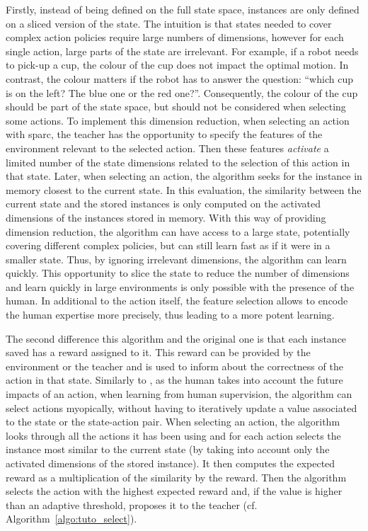 Firstly, instead of being defined on the full state space, instances are only defined on a sliced version of the state. The intuition is that states needed to cover complex action policies require large numbers of dimensions, however for each single action, large parts of the state are irrelevant. For example, if a robot needs to pick-up a cup, the colour of the cup does not impact the optimal motion. In contrast, the colour matters if the robot has to answer the question: ``which cup is on the left? The blue one or the red one?''. Consequently, the colour of the cup should be part of the state space, but should not be considered when selecting some actions. To implement this dimension reduction, when selecting an action with \gls{sparc}, the teacher has the opportunity to specify the features of the environment relevant to the selected action. Then these features \textit{activate} a limited number of the state dimensions related to the selection of this action in that state. Later, when selecting an action, the algorithm seeks for the instance in memory closest to the current state. In this evaluation, the similarity between the current state and the stored instances is only computed on the activated dimensions of the instances stored in memory. With this way of providing dimension reduction, the algorithm can have access to a large state, potentially covering different complex policies, but can still learn fast as if it were in a smaller state. Thus, by ignoring irrelevant dimensions, the algorithm can learn quickly. This opportunity to slice the state to reduce the number of dimensions and learn quickly in large environments is only possible with the presence of the human. In additional to the action itself, the feature selection allows to encode the human expertise more precisely, thus leading to a more potent learning.

The second difference this algorithm and the original one is that each instance saved has a reward assigned to it. This reward can be provided by the environment or the teacher and is used to inform about the correctness of the action in that state. Similarly to \cite{knox2009interactively}, as the human takes into account the future impacts of an action, when learning from human supervision, the algorithm can select actions myopically, without having to iteratively update a value associated to the state or the state-action pair. When selecting an action, the algorithm looks through all the actions it has been using and for each action selects the instance most similar to the current state (by taking into account only the activated dimensions of the stored instance). It then computes the expected reward as a multiplication of the similarity by the reward. Then the algorithm selects the action with the highest expected reward and, if the value is higher than an adaptive threshold, proposes it to the teacher (cf. Algorithm~\ref{algo:tuto_select}). 

